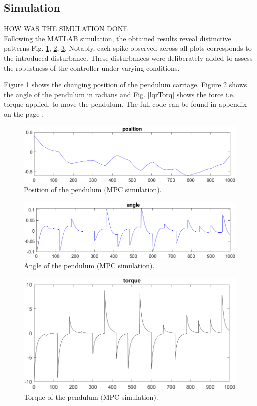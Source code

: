 \subsection{Simulation}

HOW WAS THE SIMULATION DONE\\

Following the MATLAB simulation, the obtained results reveal distinctive patterns Fig. \ref{mpcPos}, \ref{mpcAng}, \ref{mpcTor}. Notably, each spike observed across all plots corresponds to the introduced disturbance. These disturbances were deliberately added to assess the robustness of the controller under varying conditions.

Figure \ref{mpcPos} shows the changing position of the pendulum carriage. Figure \ref{mpcAng} shows the angle of the pendulum in radians and Fig. \ref{lqrTorq} shows the force i.e. torque applied, to move the pendulum. The full code can be found in appendix on the page \pageref{mpcSim.m}.

\begin{figure}[!tbh]
	\centering
	\includegraphics[width=150mm]{obr/mpcPos.png}
	\caption{Position of the pendulum $($MPC simulation$)$.}\label{mpcPos}
\end{figure}

\begin{figure}[!tbh]
	\centering
	\includegraphics[width=150mm]{obr/mpcAng.png}
	\caption{Angle of the pendulum $($MPC simulation$)$.}\label{mpcAng}
\end{figure}

\begin{figure}[!tbh]
	\centering
	\includegraphics[width=150mm]{obr/mpcTor.png}
	\caption{Torque of the pendulum $($MPC simulation$)$.}\label{mpcTor}
\end{figure}

